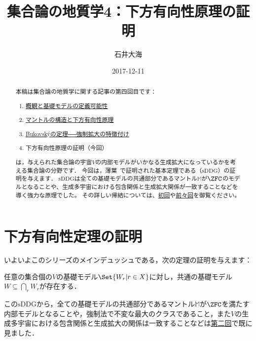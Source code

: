 \documentclass[a4j,leqno]{ltjsarticle}
\title{集合論の地質学4：下方有向性原理の証明}
\author{石井大海}
\date{2017-12-11}
\renewcommand{\emph}[1]{\textgt{\textsf{#1}}}
\newcommand{\mantle}{\mathbb{M}}
\newcommand{\M}{\mantle}
\newcommand{\sDDG}{\mathord{\mathrm{sDDG}}}
\begin{document}
\maketitle

\begin{abstract}
 本稿は集合論の地質学に関する記事の第四回目です：
 \begin{enumerate}[label={\arabic*.}]
  \item \href{https://konn-san.com/math/geology-ground-definability.html}{概観と基礎モデルの定義可能性}
  \item \href{https://konn-san.com/math/geology-mantle-and-ddg.html}{マントルの構造と下方有向性原理}
  \item \href{https://konn-san.com/math/geology-bukovsky-theorem.html}{Bukovsk\'{y}の定理──強制拡大の特徴付け}
  \item 下方有向性原理の証明（今回）
 \end{enumerate} 
 \emph{集合論の地質学}は，与えられた集合論の宇宙$V$の内部モデルがいかなる生成拡大になっているかを考える集合論の分野です．
 今回は，薄葉~\cite{Usuba:2017fp}で証明された基本定理である\emph{下方有向性原理}（$\mathrm{sDDG}$）の証明を与えます．
 $\mathrm{sDDG}$は全ての基礎モデルの共通部分であるマントル$\mathbb{M}$が$\ZFC$のモデルとなることや、生成多宇宙における包含関係と生成拡大関係が一致することなどを導く強力な原理でした。
 その詳しい帰結については、\href{https://konn-san.com/math/geology-ground-definability.html}{初回}や\href{https://konn-san.com/math/geology-mantle-and-ddg.html}{前々回}を御覧ください。
\end{abstract}
\section{下方有向性定理の証明}
いよいよこのシリーズのメインデュッシュである，次の定理の証明を与えます：
\begin{theorem}
 任意の集合個の$V$の基礎モデル$\Set{W_r | r \in X}$に対し，共通の基礎モデル$W \subseteq \bigcap_r W_r$が存在する．
\end{theorem}
この$\sDDG$から，全ての基礎モデルの共通部分であるマントル$\M$が$\ZFC$を満たす内部モデルとなることや，強制法で不変な最大のクラスであること，また$V$の生成多宇宙における包含関係と生成拡大の関係は一致することなどは\href{https://konn-san.com/math/geology-mantle-and-ddg.html}{第二回}で既に見ました．
\end{document}
